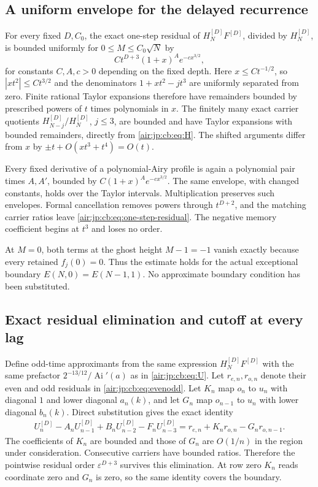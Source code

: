 \documentclass[11pt,letterpaper]{article}
\numberwithin{equation}{section}
\theoremstyle{remark}
\newcommand{\Ai}{\operatorname{Ai}}
\newcommand{\eps}{\varepsilon}
\begin{document}
\subsection{A uniform envelope for the delayed recurrence}
For every fixed $D,C_0$, the exact one-step residual of $H_N^{[D]}F^{[D]}$, divided by $H_N^{[D]}$, is bounded uniformly for $0\le M\le C_0\sqrt N$ by
\begin{equation}\label{air:jp:cb:eq:one-step-residual}
 Ct^{D+3}(1+x)^A e^{-cx^{3/2}},
\end{equation}
for constants $C,A,c>0$ depending on the fixed depth. Here $x\le Ct^{-1/2}$, so $|xt^2|\le Ct^{3/2}$ and the denominators $1+xt^2-jt^3$ are uniformly separated from zero. Finite rational Taylor expansions therefore have remainders bounded by prescribed powers of $t$ times polynomials in $x$. The finitely many exact carrier quotients $H_{N-j}^{[D]}/H_N^{[D]}$, $j\le3$, are bounded and have Taylor expansions with bounded remainders, directly from \eqref{air:jp:cb:eq:H}. The shifted arguments differ from $x$ by $\pm t+O(xt^3+t^4)=O(t)$.

Every fixed derivative of a polynomial-Airy profile is again a polynomial pair times $A,A'$, bounded by $C(1+x)^Ae^{-cx^{3/2}}$. The same envelope, with changed constants, holds over the Taylor intervals. Multiplication preserves such envelopes. Formal cancellation removes powers through $t^{D+2}$, and the matching carrier ratios leave \eqref{air:jp:cb:eq:one-step-residual}. The negative memory coefficient begins at $t^3$ and loses no order.

At $M=0$, both terms at the ghost height $M-1=-1$ vanish exactly because every retained $f_j(0)=0$. Thus the estimate holds for the actual exceptional boundary $E(N,0)=E(N-1,1)$. No approximate boundary condition has been substituted.

\subsection{Exact residual elimination and cutoff at every lag}
Define odd-time approximants from the same expression $H_N^{[D]}F^{[D]}$ with the same prefactor $2^{-13/12}/\Ai'(a)$ as in \eqref{air:jp:cb:eq:U}. Let $r_{e,n},r_{o,n}$ denote their even and odd residuals in \eqref{air:jp:cb:eq:evenodd}. Let $K_n$ map $o_n$ to $u_n$ with diagonal $1$ and lower diagonal $a_n(k)$, and let $G_n$ map $o_{n-1}$ to $u_n$ with lower diagonal $b_n(k)$. Direct substitution gives the exact identity
\begin{align}
 U_n^{[D]}-A_nU_{n-1}^{[D]}+B_nU_{n-2}^{[D]}-F_nU_{n-3}^{[D]}
 =r_{e,n}+K_nr_{o,n}-G_nr_{o,n-1}.\label{air:jp:cb:eq:residual-elimination}
\end{align}
The coefficients of $K_n$ are bounded and those of $G_n$ are $O(1/n)$ in the region under consideration. Consecutive carriers have bounded ratios. Therefore the pointwise residual order $\eps^{D+3}$ survives this elimination. At row zero $K_n$ reads coordinate zero and $G_n$ is zero, so the same identity covers the boundary.
\end{document}
